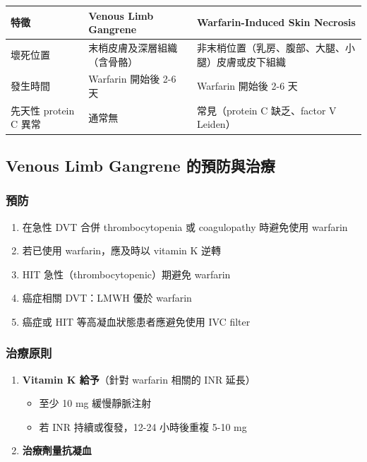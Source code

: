 \documentclass[12pt,a4paper]{article}
\begin{document}
\begin{longtable}{p{5cm}p{5cm}p{5cm}}
\toprule
\textbf{特徵} & \textbf{Venous Limb Gangrene} & \textbf{Warfarin-Induced Skin Necrosis} \\
\midrule
\endfirsthead
壞死位置 & 末梢皮膚及深層組織（含骨骼） & 非末梢位置（乳房、腹部、大腿、小腿）皮膚或皮下組織 \\
\midrule
發生時間 & Warfarin 開始後 2-6 天 & Warfarin 開始後 2-6 天 \\
\midrule
先天性 protein C 異常 & 通常無 & 常見（protein C 缺乏、factor V Leiden） \\
\bottomrule
\end{longtable}

\subsection{Venous Limb Gangrene 的預防與治療}

\subsubsection{預防}

\begin{enumerate}
    \item 在急性 DVT 合併 thrombocytopenia 或 coagulopathy 時避免使用 warfarin
    \item 若已使用 warfarin，應及時以 vitamin K 逆轉
    \item HIT 急性（thrombocytopenic）期避免 warfarin
    \item 癌症相關 DVT：LMWH 優於 warfarin
    \item 癌症或 HIT 等高凝血狀態患者應避免使用 IVC filter
\end{enumerate}

\subsubsection{治療原則}

\begin{enumerate}
    \item \textbf{Vitamin K 給予}（針對 warfarin 相關的 INR 延長）
    \begin{itemize}
        \item 至少 10 mg 緩慢靜脈注射
        \item 若 INR 持續或復發，12-24 小時後重複 5-10 mg
    \end{itemize}
    \item \textbf{治療劑量抗凝血}
\end{enumerate}
\end{document}
